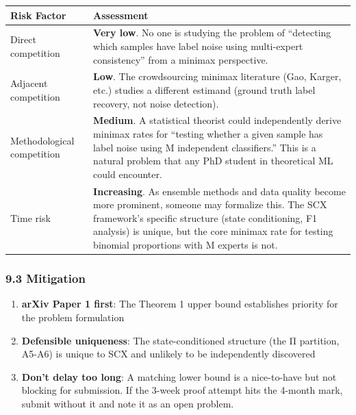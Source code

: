 \documentclass[
  12pt,
]{article}
\providecommand{\tightlist}{%
  \setlength{\itemsep}{0pt}\setlength{\parskip}{0pt}}
\begin{document}
\begin{longtable}[]{@{}
  >{\raggedright\arraybackslash}p{}
  >{\raggedright\arraybackslash}p{}@{}}
\toprule\noalign{}
\begin{minipage}[b]{\linewidth}\raggedright
Risk Factor
\end{minipage} & \begin{minipage}[b]{\linewidth}\raggedright
Assessment
\end{minipage} \\
\midrule\noalign{}
\endhead
\bottomrule\noalign{}
\endlastfoot
Direct competition & \textbf{Very low}. No one is studying the problem
of ``detecting which samples have label noise using multi-expert
consistency'' from a minimax perspective. \\
Adjacent competition & \textbf{Low}. The crowdsourcing minimax
literature (Gao, Karger, etc.) studies a different estimand (ground
truth label recovery, not noise detection). \\
Methodological competition & \textbf{Medium}. A statistical theorist
could independently derive minimax rates for ``testing whether a given
sample has label noise using M independent classifiers.'' This is a
natural problem that any PhD student in theoretical ML could
encounter. \\
Time risk & \textbf{Increasing}. As ensemble methods and data quality
become more prominent, someone may formalize this. The SCX framework's
specific structure (state conditioning, F1 analysis) is unique, but the
core minimax rate for testing binomial proportions with M experts is
not. \\
\end{longtable}

\subsubsection{9.3 Mitigation}\label{mitigation}

\begin{enumerate}
\def\labelenumi{\arabic{enumi}.}
\tightlist
\item
  \textbf{arXiv Paper 1 first}: The Theorem 1 upper bound establishes
  priority for the problem formulation
\item
  \textbf{Defensible uniqueness}: The state-conditioned structure (the Π
  partition, A5-A6) is unique to SCX and unlikely to be independently
  discovered
\item
  \textbf{Don't delay too long}: A matching lower bound is a
  nice-to-have but not blocking for submission. If the 3-week proof
  attempt hits the 4-month mark, submit without it and note it as an
  open problem.
\end{enumerate}
\end{document}
